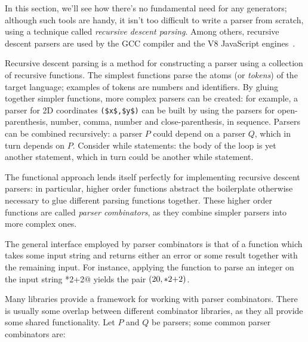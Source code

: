 \documentclass[UdineBachThesis,american,11pt]{PhdThesis}
\begin{document}
  In this section, we'll see how there's no fundamental need for any generators;
  although such tools are handy, it isn't too difficult to write a parser from
  scratch, using a technique called \emph{recursive descent parsing}. Among
  others, recursive descent parsers are used by the GCC compiler and the V8
  JavaScript engines~\cite{recursive-descent-parsing}.

  Recursive descent parsing is a method for constructing a parser using a
  collection of recursive functions. The simplest functions parse the atoms (or
  \emph{tokens}) of the target language; examples of tokens are numbers and
  identifiers. By gluing together simpler functions, more complex parsers can be
  created: for example, a parser for 2D coordinates
  \lstinline[mathescape]@($x$,$y$)@ can be built by using the parsers for
  open-parenthesis, number, comma, number and close-parenthesis, in sequence.
  Parsers can be combined recursively: a parser $P$ could depend on a parser
  $Q$, which in turn depends on $P$\@. Consider while statements: the body of
  the loop is yet another statement, which in turn could be another while
  statement.

  The functional approach lends itself perfectly for implementing recursive
  descent parsers: in particular, higher order functions abstract the
  boilerplate otherwise necessary to glue different parsing functions together.
  These higher order functions are called \emph{parser combinators}, as they
  combine simpler parsers into more complex ones.

  The general interface employed by parser combinators is that of a function
  which takes some input string and returns either an error or some result
  together with the remaining input. For instance, applying the function to
  parse an integer on the input string *2+2@ yields the pair
  $\left(20, \text{\lstinline@*2+2@}\right)$.

  Many libraries provide a framework for working with parser combinators. There
  is usually some overlap between different combinator libraries, as they all
  provide some shared functionality. Let $P$ and $Q$ be parsers; some common
  parser combinators are:
\end{document}
